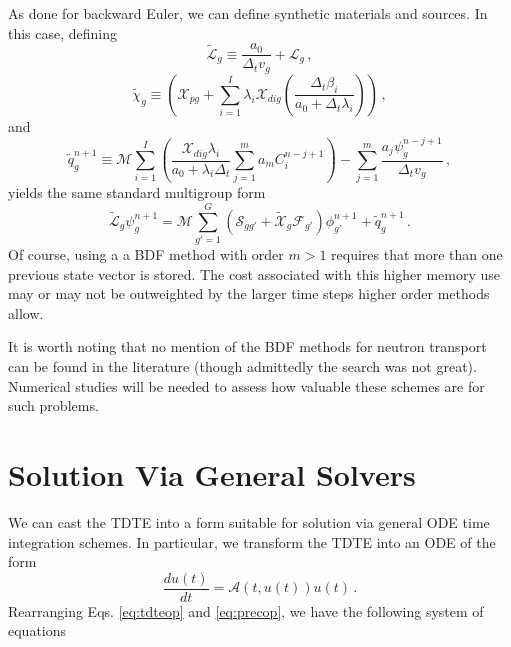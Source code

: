 As done for backward Euler, we can define synthetic 
materials and sources.  In this case, defining
\begin{equation}
 \tilde{\mathcal{L}}_g \equiv \frac{a_0}{\Delta_t v_g} + \mathcal{L}_g \, ,
\end{equation}
\begin{equation}
 \tilde{\chi}_g \equiv 
     \left( \mathcal{X}_{pg} +
        \sum_{i=1}^{I} \lambda_i \mathcal{X}_{dig} 
          \left ( \frac{ \Delta_t \beta_i }{a_{0}+\Delta_t \lambda_i} \right )
     \right )  \, ,
\end{equation}
and
\begin{equation}
 \tilde{q}^{n+1}_g \equiv 
    \mathcal{M} \sum_{i=1}^{I} \left ( \frac{ \mathcal{X}_{dig}  \lambda_i}{a_0 + \lambda_i \Delta_t} \sum^{m}_{j=1} a_m C^{n-j+1}_i \right )
    -  \sum^{m}_{j=1}  \frac{a_j \psi^{n-j+1}_g}{\Delta_tv_g} \, ,
\end{equation}
yields the same standard multigroup form
\begin{equation}
  \tilde{\mathcal{L}}_g \psi^{n+1}_g =  
         \mathcal{M} \sum_{g'=1}^G 
         \left (
           \mathcal{S}_{gg'} + 
           \tilde{\mathcal{X}}_{g}\mathcal{F}_{g'} 
         \right )\phi^{n+1}_{g'} 
         + \tilde{q}^{n+1}_g \, .
\end{equation}
Of course, using a a BDF method with order $m > 1$ requires that
more than one previous state vector is stored.  The cost associated
with this higher memory use may or may not be outweighted by the
larger time steps higher order methods allow.

It is worth noting that no mention of the BDF methods for neutron
transport can be found in the literature (though admittedly the
search was not great).  Numerical studies will be needed to 
assess how valuable these schemes are for such problems.

\section{Solution Via General Solvers}

We can cast the TDTE into a form suitable for
solution via general ODE time integration schemes.  
In particular, we transform the TDTE into 
an ODE of the form
\begin{equation}
 \frac{d u(t)}{dt} = \mathcal{A}\left (t, u(t) \right) u(t)\, .
\end{equation}
Rearranging Eqs. \ref{eq:tdteop} and \ref{eq:precop}, we have
the following system of equations

